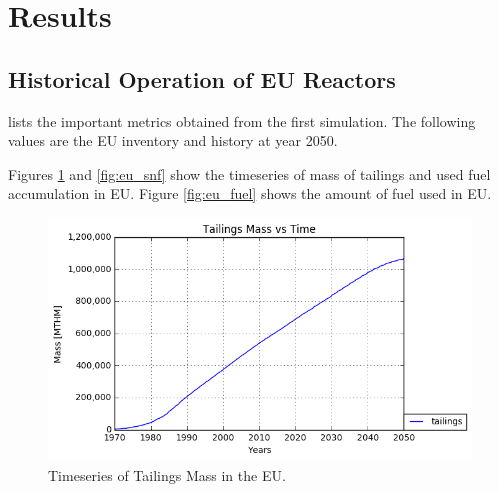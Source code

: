 \section{Results}

\subsection{Historical Operation of \gls{EU} Reactors}


\begin{table}[h]
	\centering
		\caption{Simulation Results for Historical Nuclear Operation of \gls{EU} Nations}
		\label{tab:sim_result}
		\end {table}

 lists the important metrics
obtained from the first simulation. The following
values are the \gls{EU} inventory and history at year 2050.

Figures \ref{fig:eu_tail} and \ref{fig:eu_snf} show the 
timeseries of mass of tailings and used fuel accumulation in \gls{EU}.
Figure \ref{fig:eu_fuel} shows the amount of fuel used in \gls{EU}.


\begin{figure}[htbp!]
	\begin{center}
		\includegraphics[scale=0.7]{./images/eu_future/tailings.png}
	\end{center}
	\caption{Timeseries of Tailings Mass in the \gls{EU}.}
	\label{fig:eu_tail}
\end{figure}

